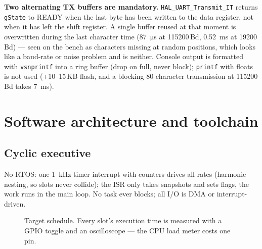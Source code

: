 \documentclass[11pt,a4paper]{article}
\newcommand{\code}[1]{\texttt{\small #1}}
\begin{document}
\textbf{Two alternating TX buffers are mandatory.} \code{HAL\_UART\_Transmit\_IT}
returns \code{gState} to READY when the last byte has been written to the data
register, not when it has left the shift register. A single buffer reused at that
moment is overwritten during the last character time (\qty{87}{\micro s} at
115200\,Bd, \qty{0.52}{ms} at 19200\,Bd) --- seen on the bench as characters
missing at random positions, which looks like a baud-rate or noise problem and is
neither. Console output is formatted with \code{vsnprintf} into a ring buffer
(drop on full, never block); \code{printf} with floats is not used (+10--15\,KB
flash, and a blocking 80-character transmission at 115200\,Bd takes \qty{7}{ms}).
\clearpage
\section{Software architecture and toolchain}\label{sec:software}

\subsection{Cyclic executive}

No RTOS: one \qty{1}{kHz} timer interrupt with counters drives all rates
(harmonic nesting, so slots never collide); the ISR only takes snapshots and sets
flags, the work runs in the main loop. No task ever blocks; all I/O is DMA or
interrupt-driven.

\begin{figure}[htbp]
\centering
{}
\caption{Target schedule. Every slot's execution time is measured with a GPIO
toggle and an oscilloscope --- the CPU load meter costs one pin.}
\end{figure}
\end{document}
